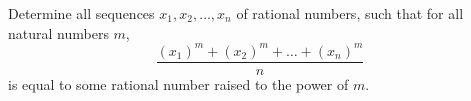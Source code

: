 Determine all sequences $x_1, x_2, \dots, x_n$ of rational numbers, such that for all natural numbers $m$,
$$\frac{(x_1)^m + (x_2)^m + \dots + (x_n)^m}{n}$$
is equal to some rational number raised to the power of $m$.
